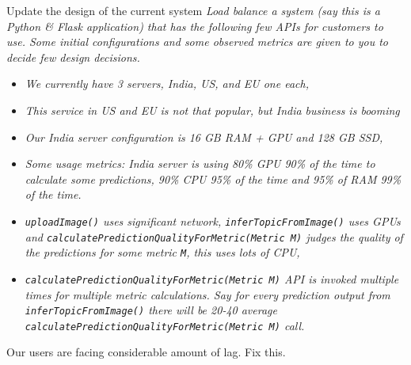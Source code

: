 \documentclass{article}
\theoremstyle{remark}
\begin{document}
\begin{ques}{Update the design of the current system}{}
\textit{Load balance a system (say this is a Python \& Flask application) that has the following
few APIs for customers to use. Some initial configurations
and some observed metrics are given to you to decide few
design decisions.}
\begin{itemize}
    \item \textit{We currently have 3 servers, India, US, and EU one each,}
    \item \textit{This service in US and EU is not that popular, but India business is booming}
    \item \textit{Our India server configuration is 16 GB RAM + GPU and 128 GB SSD,}
    \item \textit{Some usage metrics: India server is using 80\% GPU 90\% of the time to calculate some predictions, 90\% CPU 95\% of the time and 95\% of RAM 99\% of the time.}
    \item \textit{\texttt{uploadImage()} uses significant network, \texttt{inferTopicFromImage()} uses GPUs and \texttt{calculatePredictionQualityForMetric(Metric M)} judges the quality of the predictions for some metric \texttt{M}, this uses lots of CPU,}
    \item \textit{\texttt{calculatePredictionQualityForMetric(Metric M)} API is invoked multiple times for multiple metric calculations. Say for every prediction output from \texttt{inferTopicFromImage()} there will be 20-40 average \texttt{calculatePredictionQualityForMetric(Metric M)} call.}
\end{itemize}

Our users are facing considerable amount of lag. Fix this.
\end{ques}
\end{document}
